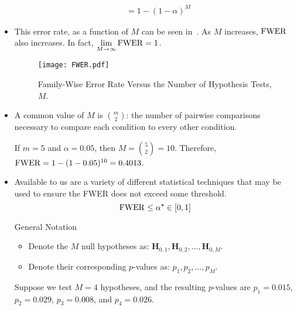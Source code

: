 \begin{itemize}
\begin{align*}
                   & =1-(1-\alpha)^M
            \end{align*}
      \item This error rate, as a function of $M$ can be seen in~. As $ M $ increases, $ \operatorname{FWER} $ also increases.
            In fact, $ \lim\limits_{{M} \to {\infty}} \operatorname{FWER}=1 $.
            \begin{figure}[!htbp]
                  \centering
                  \texttt{[image: FWER.pdf]}
                  \caption{Family-Wise Error Rate Versus the Number of Hypothesis Tests, $M$.}\label{fig:FWER}
            \end{figure}
      \item A common value of $ M $ is $ \binom{m}{2} $: the number of pairwise comparisons necessary to compare each condition
            to every other condition.
            \begin{Example}{}{}
                  If $ m=5 $ and $ \alpha=0.05 $, then $ M=\binom{5}{2}=10 $. Therefore, $ \operatorname{FWER}=1-(1-0.05)^{10}=0.4013 $.
            \end{Example}
      \item Available to us are a variety of different statistical techniques that may be used to ensure the FWER
            does not exceed some threshold.
            \[ \operatorname{FWER}\le \alpha^\star \in[0,1] \]
            \begin{Remark}{General Notation}{}
                  \begin{itemize}
                        \item Denote the $ M $ null hypotheses as: $ \mathbf{H}_{0,1},\mathbf{H}_{0,2},\ldots,\mathbf{H}_{0,M} $.
                        \item Denote their corresponding $ p $-values as: $ p_1,p_2,\ldots,p_M $.
                  \end{itemize}
            \end{Remark}
            \begin{Example}{}{}
                  Suppose we test $ M =4 $ hypotheses, and the resulting $ p $-values are $ p_1 =0.015$, $ p_2=0.029 $,
                  $ p_3=0.008 $, and $ p_4=0.026 $.
            \end{Example}
\end{itemize}
